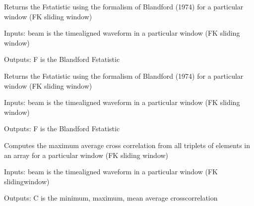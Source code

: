 \documentclass[letterpaper,10pt,english]{sphinxmanual}
\begin{document}

\begin{fulllineitems}
\label{\detokenize{infrapy.detection:infrapy.detection.beamforming.bfstat2}}
Returns the F\sphinxhyphen{}statistic using the formalism of Blandford (1974) for a particular window
(FK sliding window)

Inputs:
\sphinxhyphen{} beam is the time\sphinxhyphen{}aligned waveform in a particular window (FK sliding window)

Outputs:
\sphinxhyphen{} F is the Blandford F\sphinxhyphen{}statistic

\end{fulllineitems}


\begin{fulllineitems}
\label{\detokenize{infrapy.detection:infrapy.detection.beamforming.bfstatT}}
Returns the F\sphinxhyphen{}statistic using the formalism of Blandford (1974) for a particular window
(FK sliding window)

Inputs:
\sphinxhyphen{} beam is the time\sphinxhyphen{}aligned waveform in a particular window (FK sliding window)

Outputs:
\sphinxhyphen{} F is the Blandford F\sphinxhyphen{}statistic

\end{fulllineitems}


\begin{fulllineitems}
\label{\detokenize{infrapy.detection:infrapy.detection.beamforming.corrp}}
Computes the maximum average cross correlation from all triplets of elements in an
array for a particular window (FK sliding window)

Inputs:
\sphinxhyphen{} beam is the time\sphinxhyphen{}aligned waveform in a particular window (FK sliding\sphinxhyphen{}window)

Outputs:
\sphinxhyphen{} C is the minimum, maximum, mean average cross\sphinxhyphen{}correlation

\end{fulllineitems}
\end{document}
